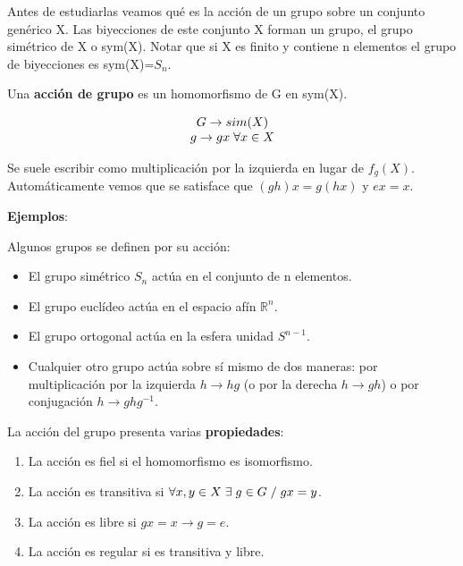 \documentclass{article}
\begin{document}
Antes de estudiarlas veamos qué es la acción de un grupo sobre un conjunto genérico X. Las biyecciones de este conjunto X forman un grupo, el grupo simétrico de X o sym(X). Notar que si X es finito y contiene n elementos el grupo de biyecciones es sym(X)=$S_n$.

\smallskip
Una \textbf{acción de grupo} es un homomorfismo de G en sym(X).

$$\begin{array}{c}
     G \to sim(X)  \\
     g\to gx \hspace{0.1cm} \forall x\in X
\end{array}$$

Se suele escribir como multiplicación por la izquierda en lugar de $f_g(X)$. Automáticamente vemos que se satisface que $(gh)x=g(hx)$ y $ex=x$.

\smallskip
\textbf{Ejemplos}:

\smallskip
Algunos grupos se definen por su acción:

\begin{itemize}
    \item El grupo simétrico $S_n$ actúa en el conjunto de n elementos.
    \item El grupo euclídeo actúa en el espacio afín $\mathds{R}^n$.
    \item El grupo ortogonal actúa en la esfera unidad $S^{n-1}$.
    \item Cualquier otro grupo actúa sobre sí mismo de dos maneras: por multiplicación por la izquierda $h\to hg$ (o por la derecha $h \to gh$) o por conjugación $h \to ghg^{-1}$.
    \end{itemize}

La acción del grupo presenta varias \textbf{propiedades}:

\begin{enumerate}
    \item La acción es fiel si el homomorfismo es isomorfismo.
    \item La acción es transitiva si $\forall x,y\in X \hspace{0.1cm}\exists \hspace{0.1cm} g\in G \hspace{0.1cm}/ \hspace{0.1cm} gx=y$.
    \item La acción es libre si $gx=x \to g=e$.
    \item La acción es regular si es transitiva y libre.
\end{enumerate}
\end{document}
